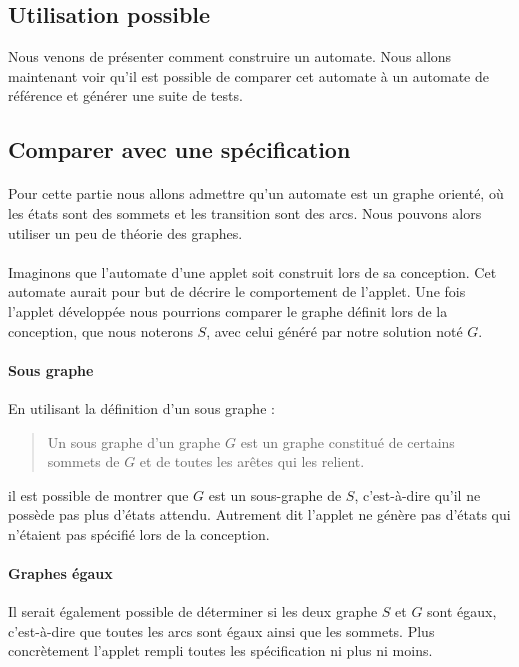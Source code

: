 \subsection{Utilisation possible}

Nous venons de présenter comment construire un automate. Nous allons maintenant 
voir qu'il est possible de comparer cet automate à un automate de référence et 
générer une suite de tests.

\subsection{Comparer avec une spécification}

\paragraph{}
Pour cette partie nous allons admettre qu'un automate est un graphe orienté, où 
les états sont des sommets et les transition sont des arcs. Nous pouvons alors 
utiliser un peu de théorie des graphes.

\paragraph{}
Imaginons que l'automate d'une applet soit construit lors de sa conception. Cet 
automate aurait pour but de décrire le comportement de l'applet. Une fois l'applet 
développée nous pourrions comparer le graphe définit lors 
de la conception, que nous noterons $S$, avec celui généré par notre solution 
 noté $G$.

\paragraph{Sous graphe}
En utilisant la définition d'un sous graphe \cite{th_graph}:

\begin{quote}
 Un sous graphe d’un graphe $G$ est un graphe constitué de certains sommets de 
$G$ et de toutes les arêtes qui les relient.
\end{quote}


il est possible de montrer que $G$ est un sous-graphe de $S$, c'est-à-dire 
qu'il ne possède pas plus d'états attendu. Autrement dit l'applet ne génère 
pas d'états qui n'étaient pas spécifié lors de la conception.

\paragraph{Graphes égaux}
Il serait également possible de déterminer si les deux graphe $S$ et $G$ sont 
égaux, c'est-à-dire que toutes les arcs sont égaux ainsi que les sommets. Plus 
concrètement l'applet rempli toutes les spécification ni plus ni moins.

